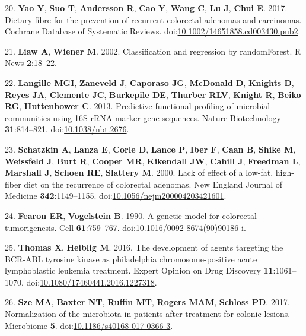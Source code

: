 \documentclass[11pt,]{article}
\begin{document}
\hypertarget{ref-Yao2017}{}
20. \textbf{Yao Y}, \textbf{Suo T}, \textbf{Andersson R}, \textbf{Cao
Y}, \textbf{Wang C}, \textbf{Lu J}, \textbf{Chui E}. 2017. Dietary fibre
for the prevention of recurrent colorectal adenomas and carcinomas.
Cochrane Database of Systematic Reviews.
doi:\href{https://doi.org/10.1002/14651858.cd003430.pub2}{10.1002/14651858.cd003430.pub2}.

\hypertarget{ref-randomforest_citation_2002}{}
21. \textbf{Liaw A}, \textbf{Wiener M}. 2002. Classification and
regression by randomForest. R News \textbf{2}:18--22.

\hypertarget{ref-Langille2013}{}
22. \textbf{Langille MGI}, \textbf{Zaneveld J}, \textbf{Caporaso JG},
\textbf{McDonald D}, \textbf{Knights D}, \textbf{Reyes JA},
\textbf{Clemente JC}, \textbf{Burkepile DE}, \textbf{Thurber RLV},
\textbf{Knight R}, \textbf{Beiko RG}, \textbf{Huttenhower C}. 2013.
Predictive functional profiling of microbial communities using 16S rRNA
marker gene sequences. Nature Biotechnology \textbf{31}:814--821.
doi:\href{https://doi.org/10.1038/nbt.2676}{10.1038/nbt.2676}.

\hypertarget{ref-Schatzkin2000}{}
23. \textbf{Schatzkin A}, \textbf{Lanza E}, \textbf{Corle D},
\textbf{Lance P}, \textbf{Iber F}, \textbf{Caan B}, \textbf{Shike M},
\textbf{Weissfeld J}, \textbf{Burt R}, \textbf{Cooper MR},
\textbf{Kikendall JW}, \textbf{Cahill J}, \textbf{Freedman L},
\textbf{Marshall J}, \textbf{Schoen RE}, \textbf{Slattery M}. 2000. Lack
of effect of a low-fat, high-fiber diet on the recurrence of colorectal
adenomas. New England Journal of Medicine \textbf{342}:1149--1155.
doi:\href{https://doi.org/10.1056/nejm200004203421601}{10.1056/nejm200004203421601}.

\hypertarget{ref-Fearon1990}{}
24. \textbf{Fearon ER}, \textbf{Vogelstein B}. 1990. A genetic model for
colorectal tumorigenesis. Cell \textbf{61}:759--767.
doi:\href{https://doi.org/10.1016/0092-8674(90)90186-i}{10.1016/0092-8674(90)90186-i}.

\hypertarget{ref-Thomas2016}{}
25. \textbf{Thomas X}, \textbf{Heiblig M}. 2016. The development of
agents targeting the BCR-ABL tyrosine kinase as philadelphia
chromosome-positive acute lymphoblastic leukemia treatment. Expert
Opinion on Drug Discovery \textbf{11}:1061--1070.
doi:\href{https://doi.org/10.1080/17460441.2016.1227318}{10.1080/17460441.2016.1227318}.

\hypertarget{ref-normalization_Sze2017}{}
26. \textbf{Sze MA}, \textbf{Baxter NT}, \textbf{Ruffin MT},
\textbf{Rogers MAM}, \textbf{Schloss PD}. 2017. Normalization of the
microbiota in patients after treatment for colonic lesions. Microbiome
\textbf{5}.
doi:\href{https://doi.org/10.1186/s40168-017-0366-3}{10.1186/s40168-017-0366-3}.
\end{document}
